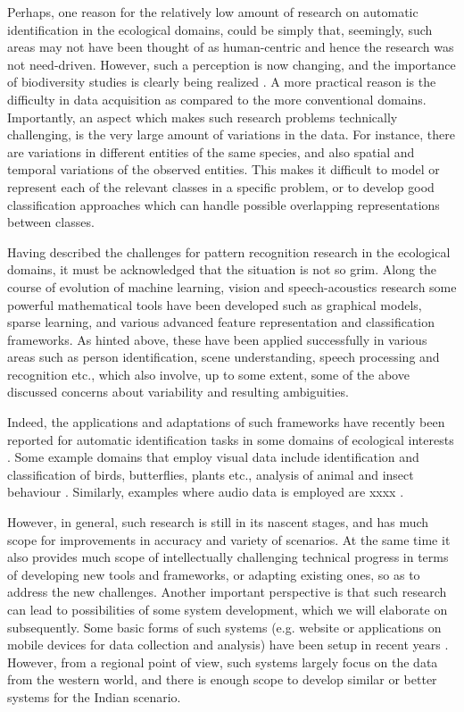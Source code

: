 \documentclass{article}
\begin{document}
Perhaps, one reason for the relatively low amount of research on automatic identification in the ecological domains, could be simply that, seemingly, such areas may not have been thought of as human-centric and hence the research was not need-driven. However, such a perception is now changing, and the importance of biodiversity studies is clearly being realized \cite{}. A more practical reason is the difficulty in data acquisition as compared to the more conventional domains. Importantly, an aspect which makes such research problems technically challenging, is the very large amount of variations in the data. For instance, there are variations in different entities of the same species, and also spatial and temporal variations of the observed entities. This makes it difficult to model or represent each of the relevant classes in a specific problem, or to develop good classification approaches which can handle possible overlapping representations between classes.

Having described the challenges for pattern recognition research in the ecological domains, it must be acknowledged that the situation is not so grim. Along the course of evolution of machine learning, vision and speech-acoustics research some powerful mathematical tools have been developed such as graphical models, sparse learning, and various advanced feature representation and classification frameworks. 
As hinted above, these have been applied successfully in various areas such as person identification, scene understanding, speech processing and recognition etc., which also involve, up to some extent, some of the above discussed concerns about variability and resulting ambiguities. 

Indeed, the applications and adaptations of such frameworks have recently been reported for automatic identification tasks in some domains of ecological interests \cite{}. Some example domains that employ visual data include identification and classification of birds, butterflies, plants etc., analysis of animal and insect behaviour \cite{}. Similarly, examples where audio data is employed are xxxx \cite{}.

However, in general, such research is still in its nascent stages, and has much scope for improvements in accuracy and variety of scenarios. At the same time it also provides much scope of intellectually challenging technical progress in terms of developing new tools and frameworks, or adapting existing ones, so as to address the new challenges. Another important perspective is that such research can lead to possibilities of some system development, which we will elaborate on subsequently. Some basic forms of such systems (e.g. website or applications on mobile devices for data collection and analysis) have been setup in recent years \cite{}. However, from a regional point of view, such systems largely focus on the data from the western world, and there is enough scope to develop similar or better systems for the Indian scenario. 
\end{document}
